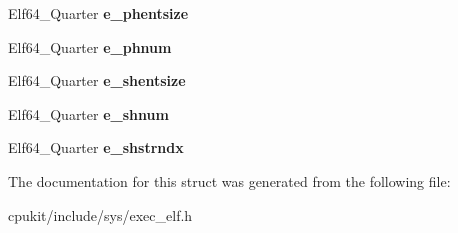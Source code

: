 \begin{DoxyCompactItemize}
\item 
\mbox{\label{structElf64__Ehdr_ae14e9a47f10b90188a092f67d5a9e2af}} 
Elf64\+\_\+\+Quarter {\bfseries e\+\_\+phentsize}
\item 
\mbox{\label{structElf64__Ehdr_afc1d64ee03edb05ad57c82c1dbf81d2b}} 
Elf64\+\_\+\+Quarter {\bfseries e\+\_\+phnum}
\item 
\mbox{\label{structElf64__Ehdr_a8908ed57d537c079c4d61b8b027ec52e}} 
Elf64\+\_\+\+Quarter {\bfseries e\+\_\+shentsize}
\item 
\mbox{\label{structElf64__Ehdr_a434b769986fb904b44862ab4739b1816}} 
Elf64\+\_\+\+Quarter {\bfseries e\+\_\+shnum}
\item 
\mbox{\label{structElf64__Ehdr_a135a81ba8e1bc80f65b1fdb9823d8b2b}} 
Elf64\+\_\+\+Quarter {\bfseries e\+\_\+shstrndx}
\end{DoxyCompactItemize}


The documentation for this struct was generated from the following file\+:\begin{DoxyCompactItemize}
\item 
cpukit/include/sys/exec\+\_\+elf.\+h\end{DoxyCompactItemize}

